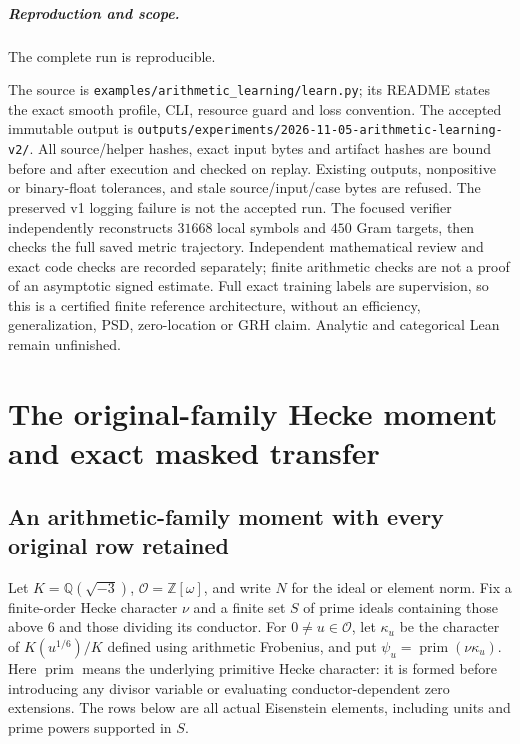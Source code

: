 \documentclass[11pt,oneside,openany]{book}
\theoremstyle{definition}\newtheorem{definition}[theorem]{Definition}
\theoremstyle{remark}\newtheorem{remark}[theorem]{Remark}
\begin{document}
\paragraph{Reproduction and scope.} The complete run is reproducible.

The source is \texttt{examples/}\allowbreak\texttt{arithmetic\_learning/}\allowbreak\texttt{learn.py}; its README
states the exact smooth profile, CLI, resource guard and loss convention.
The accepted immutable output is
\texttt{outputs/experiments/}\allowbreak\texttt{2026-11-05-arithmetic-learning-v2/}.
All source/helper hashes, exact input bytes and artifact hashes are bound
before and after execution and checked on replay. Existing outputs,
nonpositive or binary-float tolerances, and stale source/input/case bytes
are refused. The preserved v1 logging failure is not the accepted run.
The focused verifier independently reconstructs $31668$ local symbols and
$450$ Gram targets, then checks the full saved metric trajectory.
Independent mathematical review and exact code checks are recorded separately;
finite arithmetic checks are not a proof of an asymptotic signed estimate.
Full exact training labels are supervision, so this is a certified finite
reference architecture, without an efficiency, generalization, PSD,
zero-location or GRH claim. Analytic and categorical Lean remain unfinished.


\chapter{The original-family Hecke moment and exact masked transfer}
\section{An arithmetic-family moment with every original row retained}
\label{mm:core}
Let $K=\mathbb Q(\sqrt{-3})$, $\mathcal O=\mathbb Z[\omega]$, and write
$N$ for the ideal or element norm. Fix a finite-order Hecke character
$\nu$ and a finite set $S$ of prime ideals containing those above $6$ and
those dividing its conductor. For $0\ne u\in\mathcal O$, let $\kappa_u$
be the character of $K(u^{1/6})/K$ defined using arithmetic Frobenius, and
put $\psi_u=\operatorname{prim}(\nu\kappa_u)$. Here
$\operatorname{prim}$ means the underlying primitive Hecke character:
it is formed before introducing any divisor variable or evaluating
conductor-dependent zero extensions. The rows below are all actual
Eisenstein elements, including units and prime powers supported in $S$.
\end{document}
